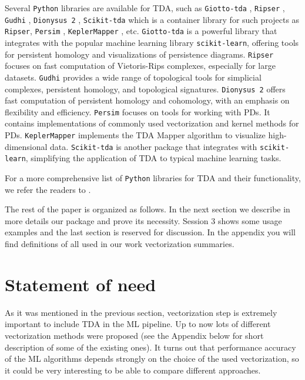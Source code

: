 \documentclass{article}
\begin{document}
Several \texttt{Python} libraries are available for TDA, such as \texttt{Giotto-tda} \cite{tauzin2021giotto}, \texttt{Ripser} \cite{christopher2018lean}, \texttt{Gudhi} \cite{rouvreau2020gudhi}, \texttt{Dionysus 2} \cite{Dionysus2}, \texttt{Scikit-tda} \cite{scikittda2019} which is a container library for such projects as  \texttt{Ripser}, \texttt{Persim} \cite{Persim},  \texttt{KeplerMapper} \cite{van2019kepler}, etc. \texttt{Giotto-tda} is a powerful library that integrates with the popular machine learning library \texttt{scikit-learn}, offering tools for persistent homology and visualizations of persistence diagrams. \texttt{Ripser} focuses on fast computation of Vietoris-Rips complexes, especially for large datasets. \texttt{Gudhi} provides a wide range of topological tools for simplicial complexes, persistent homology, and topological signatures. \texttt{Dionysus 2} offers fast computation of persistent homology and cohomology, with an emphasis on flexibility and efficiency. \texttt{Persim} focuses on tools for working with PDs. It contains implementations of commonly used vectorization and kernel methods for PDs. \texttt{KeplerMapper} implements the TDA Mapper algorithm to visualize high-dimensional data. \texttt{Scikit-tda} is another package that integrates with \texttt{scikit-learn}, simplifying the application of TDA to typical machine learning tasks. 

For a more comprehensive list of \texttt{Python} libraries for TDA and their functionality, we refer the readers to \cite{awesome-tda:2024}.


The rest of the paper is organized as follows. In the next section we describe in more details our package and prove its necessity. Session 3 shows some usage examples and the last section is reserved for discussion. In the appendix you will find definitions of all used in our work vectorization summaries.



\section{Statement of need}

As it was mentioned in the previous section, vectorization step is extremely important to include TDA in the ML pipeline. Up to now lots of different vectorization methods were proposed (see the Appendix below for short description of some of the existing ones). It turns out that performance accuracy of the ML algorithms depends strongly on the choice of the used vectorization, so it could be very interesting to be able to compare different approaches.
\end{document}
